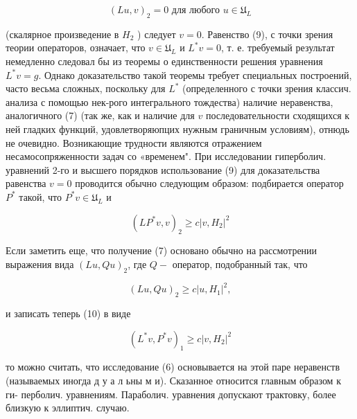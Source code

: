 \documentclass[10pt]{article}
\begin{document}
\[

(L u, v)_{2}=0 \text { для любого } u \in \mathfrak{U}_{L}

\]



(скалярное произведение в $H_{2}$ ) следует $v=0$. Равенство (9), с точки зрения теории операторов, означает, что $v \in \mathfrak{U}_{L}$ и $L^{*} v=0$, т. е. требуемый результат немедленно следовал бы из теоремы о единственности решения уравнения $L^{*} v=g$. Однако доказательство такой теоремы требует специальных построений, часто весьма сложных, поскольку для $L^{*}$ (определенного с точки зрения классич. анализа с помощью нек-рого интегрального тождества) наличие неравенства, аналогичного (7) (так же, как и наличие для $v$ последовательности сходящихся к ней гладких функций, удовлетворяюпцих нужным граничным условиям), отнюдь не очевидно. Возникающие трудности являются отражением несамосопряженности задач со «временем". При исследовании гиперболич. уравнений 2-го и высшего порядков использование (9) для доказательства равенства $v=0$ проводится обычно следующим образом: подбирается оператор $P^{*}$ такой, что $P^{*} v \in \mathfrak{U}_{L}$ и



\[

\left(L P^{*} v, v\right)_{2} \geqslant c\left|v, H_{2}\right|^{2}

\]



Если заметить еще, что получение (7) основано обычно на рассмотрении выражения вида $(L u, Q u)_{2}$, где $Q-$ оператор, подобранный так, что



\[

(L u, Q u)_{2} \geqslant c\left|u, H_{1}\right|^{2},

\]



и записать теперь (10) в виде



\[

\left(L^{*} v, P^{*} v\right)_{1} \geqslant c\left|v, H_{2}\right|^{2}

\]



то можно считать, что исследование (6) основывается на этой паре неравенств (называемых иногда д у а л ьны м и). Сказанное относится главным образом к ги- перболич. уравнениям. Параболич. уравнения допускают трактовку, более близкую к эллиптич. случаю.
\end{document}
